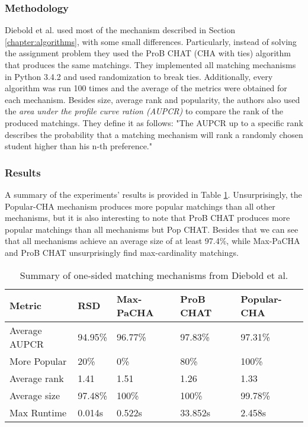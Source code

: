 \subsubsection{Methodology}
Diebold et al. used most of the mechanism described in Section \ref{chapter:algorithms}, with some small differences. Particularly, instead of solving the assignment problem they used the ProB CHAT (CHA with ties) algorithm that produces the same matchings. They implemented all matching mechanisms in Python 3.4.2 and used randomization to break ties. Additionally, every algorithm was run 100 times and the average of the metrics were obtained for each mechanism. 
Besides size, average rank and popularity, the authors also used the \emph{area under the profile curve ration (AUPCR)} to compare the rank of the produced matchings. They define it as follows: "The AUPCR up to a specific rank describes the probability that a matching mechanism will rank a randomly chosen student higher than his n-th preference."\cite{DieboldBenchmark}

\subsubsection{Results}
A summary of the experiments' results is provided in Table \ref{tab:diebold-benchmark}. Unsurprisingly, the Popular-CHA mechanism produces more popular matchings than all other mechanisms, but it is also interesting to note that ProB CHAT produces more popular matchings than all mechanisms but Pop CHAT. Besides that we can see that all mechanisms achieve an average size of at least 97.4\%, while Max-PaCHA and ProB CHAT unsurprisingly find max-cardinality matchings.

\begin{table}[h!]
    \centering 
    \begin{tabular}{|l|l|l|l|l|}
        \hline
        Metric & RSD & Max-PaCHA & ProB CHAT & Popular-CHA \\ \hline
        Average AUPCR & 94.95\% & 96.77\% & \cellcolor[HTML]{9AFF99}97.83\% & 97.31\% \\ \hline
        More Popular & 20\% & 0\% & 80\% & \cellcolor[HTML]{9AFF99}100\% \\ \hline
        Average rank & 1.41 & 1.51 & \cellcolor[HTML]{9AFF99}1.26 & 1.33 \\ \hline
        Average size & 97.48\% & \cellcolor[HTML]{9AFF99}100\% & \cellcolor[HTML]{9AFF99}100\% & 99.78\% \\ \hline
        Max Runtime & \cellcolor[HTML]{9AFF99}0.014s & 0.522s & \cellcolor[HTML]{FFCCC9}33.852s & 2.458s \\ \hline
        \end{tabular}
    \caption{Summary of one-sided matching mechanisms from Diebold et al. \cite{DieboldBenchmark}}
    \label{tab:diebold-benchmark}
\end{table}

